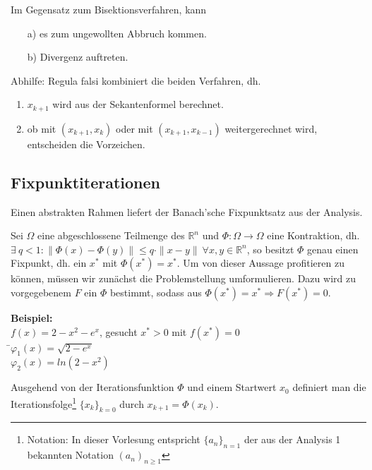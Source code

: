 \begin{bemerkung}
Im Gegensatz zum Bisektionsverfahren, kann
\begin{enumerate}
\item[a)] es zum ungewollten Abbruch kommen.
\item[b)] Divergenz auftreten.
\end{enumerate}

Abhilfe: Regula falsi kombiniert die beiden Verfahren, dh.
\begin{enumerate}
\item  $x_{k+1}$ wird aus der Sekantenformel berechnet.
\item  ob mit $(x_{k+1},x_k)$ oder mit $(x_{k+1},x_{k-1})$ weitergerechnet wird, entscheiden die Vorzeichen.
\end{enumerate}
\end{bemerkung}


\subsection{Fixpunktiterationen}

Einen abstrakten Rahmen liefert der Banach'sche Fixpunktsatz aus der Analysis.
\newline

\noindent Sei $\Omega$ eine abgeschlossene Teilmenge des $\mathbb{R}^n$ und $\Phi: \Omega
\longrightarrow \Omega$ eine Kontraktion, dh. $\exists \ q<1: \| \Phi(x) -
\Phi(y)\| \leq q\cdot \|x-y\|~\forall x,y \in \mathbb{R}^n$, so besitzt $\Phi$
genau einen Fixpunkt, dh. ein $x^*$ mit $\Phi(x^*)=x^*$.  Um von dieser Aussage
profitieren zu können, müssen wir zunächst die Problemstellung umformulieren.
Dazu wird zu vorgegebenem $F$ ein $\Phi$ bestimmt, sodass aus $\Phi(x^*)=x^*
\Rightarrow F(x^*)=0$.

\begin{tabbing}
\textbf{Beispiel:}
\\$f(x)=2-x^2-e^x$, gesucht $x^*>0$ mit $f(x^*)=0$\\
\hspace*{8mm} \=$\varphi_1(x)=\sqrt{2-e^x}$\\
\>$\varphi_2(x)=ln(2-x^2)$\\
\end{tabbing}

\begin{definition} [Fixpunktiteration]
Ausgehend von der Iterationsfunktion $\Phi$ und einem Startwert $x_0$ definiert
man die Iterationsfolge\footnote{Notation: In dieser Vorlesung entspricht
$\{a_n\}_{n=1}$ der aus der Analysis 1 bekannten Notation $(a_n)_{n\geq 1}$}
$\{x_k\}_{k=0}$ durch $x_{k+1}=\Phi(x_k)$.
\end{definition}

